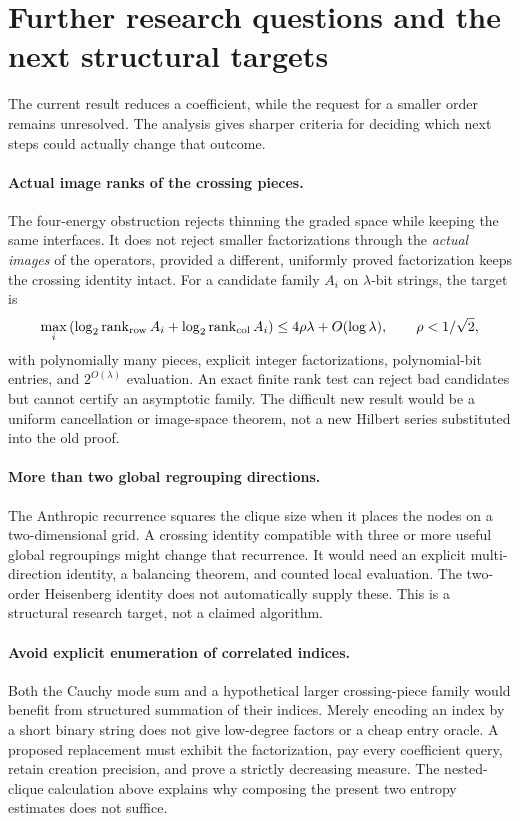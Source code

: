\section{Further research questions and the next structural targets}
\label{sec:research}

The current result reduces a coefficient, while the request for a smaller
order remains unresolved. The analysis gives sharper criteria for deciding
which next steps could actually change that outcome.

\paragraph{Actual image ranks of the crossing pieces.}
The four-energy obstruction rejects thinning the graded space while keeping
the same interfaces. It does not reject smaller factorizations through the
\emph{actual images} of the operators, provided a different, uniformly
proved factorization keeps the crossing identity intact. For a candidate
family $A_i$ on $\lambda$-bit strings, the target is
\[
 \max_i\left(\log_2\operatorname{rank}_{\rm row}A_i+
             \log_2\operatorname{rank}_{\rm col}A_i\right)
 \le4\rho\lambda+O(\log\lambda),\qquad \rho<1/\sqrt2,
\]
with polynomially many pieces, explicit integer factorizations,
polynomial-bit entries, and $2^{O(\lambda)}$ evaluation. An exact finite
rank test can reject bad candidates but cannot certify an asymptotic family.
The difficult new result would be a uniform cancellation or image-space
theorem, not a new Hilbert series substituted into the old proof.

\paragraph{More than two global regrouping directions.}
The Anthropic recurrence squares the clique size when it places the nodes
on a two-dimensional grid. A crossing identity compatible with three or
more useful global regroupings might change that recurrence. It would need
an explicit multi-direction identity, a balancing theorem, and counted
local evaluation. The two-order Heisenberg identity does not automatically
supply these. This is a structural research target, not a claimed algorithm.

\paragraph{Avoid explicit enumeration of correlated indices.}
Both the Cauchy mode sum and a hypothetical larger crossing-piece family
would benefit from structured summation of their indices. Merely encoding
an index by a short binary string does not give low-degree factors or a
cheap entry oracle. A proposed replacement must exhibit the factorization,
pay every coefficient query, retain creation precision, and prove a
strictly decreasing measure. The nested-clique calculation above explains
why composing the present two entropy estimates does not suffice.

